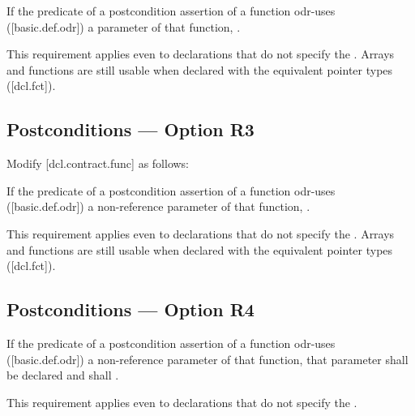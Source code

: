 \begin{adjustwidth}{0.5cm}{0.5cm}
If the predicate of a postcondition assertion of a function odr-uses ([basic.def.odr]) a
parameter of that function, .
\begin{note}
This requirement applies even to declarations
that do not specify the . Arrays and functions are still usable when declared with the equivalent pointer types ([dcl.fct]).
\end{note}
\begin{example}
\tcode{[...]}
\end{example}
\end{adjustwidth}

\subsection*{Postconditions --- Option R3}

Modify [dcl.contract.func] as follows:

\begin{adjustwidth}{0.5cm}{0.5cm}
If the predicate of a postcondition assertion of a function odr-uses ([basic.def.odr]) a
non-reference parameter of that function, .
\begin{note}
This requirement applies even to declarations
that do not specify the . Arrays and functions are still usable when declared with the equivalent pointer types ([dcl.fct]).
\end{note}
\begin{example}
\tcode{[...]}
\end{example}
\end{adjustwidth}

\subsection*{Postconditions --- Option R4}

\begin{adjustwidth}{0.5cm}{0.5cm}
If the predicate of a postcondition assertion of a function odr-uses ([basic.def.odr]) a
non-reference parameter of that function, that parameter shall be declared  and shall .
\begin{note}
This requirement applies even to declarations
that do not specify the .
\end{note}
\begin{example}
\tcode{[...]}
\end{example}
\end{adjustwidth}

